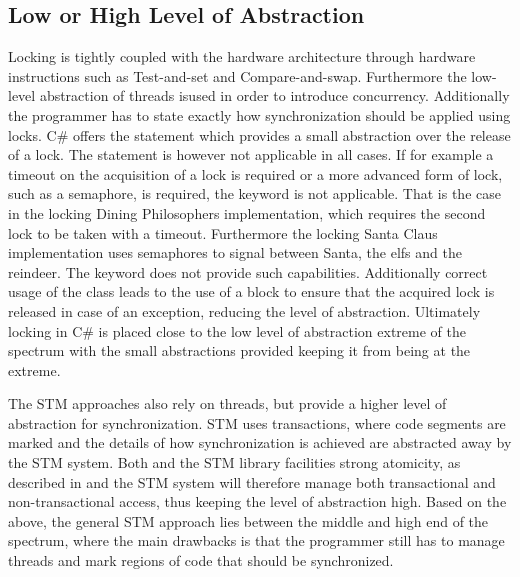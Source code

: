\subsection{Low or High Level of Abstraction}\label{subsec:level_of_abstraction}
Locking is tightly coupled with the hardware architecture through hardware instructions such as Test-and-set and Compare-and-swap\cite[p. 1990]{scott2011sync}. Furthermore the low-level abstraction of threads isused in order to introduce concurrency. Additionally the programmer has to state exactly how synchronization should be applied using locks. C\# offers the  statement which provides a small abstraction over the release of a lock. The  statement is however not applicable in all cases. If for example a timeout on the acquisition of a lock is required or a more advanced form of lock, such as a semaphore, is required, the  keyword is not applicable. That is the case in the locking Dining Philosophers implementation, which requires the second lock to be taken with a timeout. Furthermore the locking Santa Claus implementation uses semaphores to signal between Santa, the elfs and the reindeer. The  keyword does not provide such capabilities. Additionally correct usage of the  class leads to the use of a  block to ensure that the acquired lock is released in case of an exception\cite{msdnMonitorEnter}, reducing the level of abstraction. Ultimately locking in C\# is placed close to the low level of abstraction extreme of the spectrum with the small abstractions provided keeping it from being at the extreme.

The \ac{STM} approaches also rely on threads, but provide a higher level of abstraction for synchronization. \ac{STM} uses transactions, where code segments are marked and the details of how synchronization is achieved are abstracted away by the \ac{STM} system. Both \stmname and the \ac{STM} library facilities strong atomicity, as described in  and the \ac{STM} system will therefore manage both transactional and non-transactional access, thus keeping the level of abstraction high. Based on the above, the general \ac{STM} approach lies between the middle and high end of the spectrum, where the main drawbacks is that the programmer still has to manage threads and mark regions of code that should be synchronized.

